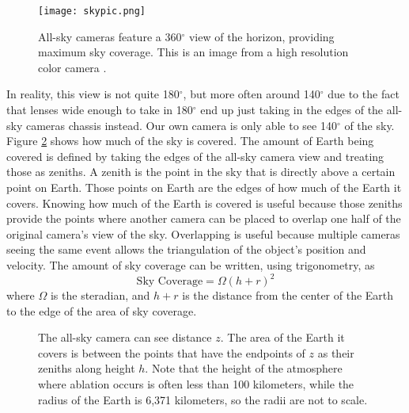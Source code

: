 \begin{figure}[ht!]
  \centering
  \texttt{[image: skypic.png]}
  \caption{All-sky cameras feature a 360$^{\circ}$ view of the horizon, providing maximum sky coverage. This is an image from a high resolution color camera \protect\cite{Alcor}.}
  \label{fig:skypic}
\end{figure}

In reality, this view is not quite 180$^{\circ}$, but more often around 140$^{\circ}$ due to the fact that lenses wide enough to take in 180$^{\circ}$ end up just taking in the edges of the all-sky cameras chassis instead. Our own camera is only able to see 140$^{\circ}$ of the sky. Figure \ref{fig:atmosphere} shows how much of the sky is covered. The amount of Earth being covered is defined by taking the edges of the all-sky camera view and treating those as zeniths. A zenith is the point in the sky that is directly above a certain point on Earth. Those points on Earth are the edges of how much of the Earth it covers. Knowing how much of the Earth is covered is useful because those zeniths provide the points where another camera can be placed to overlap one half of the original camera's view of the sky. Overlapping is useful because multiple cameras seeing the same event allows the triangulation of the object's position and velocity. The amount of sky coverage can be written, using trigonometry, as
\begin{equation} \label{eq:coverage}
	\textrm{Sky Coverage} = \Omega(h+r)^2
\end{equation}
where $\Omega$ is the steradian, and $h+r$ is the distance from the center of the Earth to the edge of the area of sky coverage.

\begin{figure}[ht!]
	\centering
	\caption{The all-sky camera can see distance $z$. The area of the Earth it covers is between the points that have the endpoints of $z$ as their zeniths along height $h$. Note that the height of the atmosphere where ablation occurs is often less than 100 kilometers, while the radius of the Earth is 6,371 kilometers, so the radii are not to scale.}
	\label{fig:atmosphere}
\end{figure}

